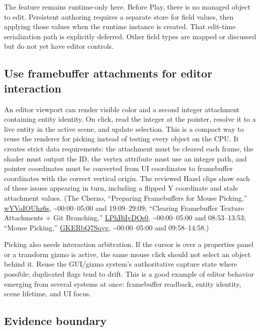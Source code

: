 The feature remains runtime-only here. Before Play, there is no managed object to edit. Persistent authoring requires a separate store for field values, then applying those values when the runtime instance is created. That edit-time serialization path is explicitly deferred. Other field types are mapped or discussed but do not yet have editor controls.

\subsection{Use framebuffer attachments for editor interaction}\label{06-engine-ii-ch032-use-framebuffer-attachments-for-editor-interaction}

\hypertarget{06-engine-ii-ch032-use-framebuffer-attachments-for-editor-interaction}{}

An editor viewport can render visible color and a second integer attachment containing entity identity. On click, read the integer at the pointer, resolve it to a live entity in the active scene, and update selection. This is a compact way to reuse the renderer for picking instead of testing every object on the CPU. It creates strict data requirements: the attachment must be cleared each frame, the shader must output the ID, the vertex attribute must use an integer path, and pointer coordinates must be converted from UI coordinates to framebuffer coordinates with the correct vertical origin. The reviewed Hazel clips show each of these issues appearing in turn, including a flipped Y coordinate and stale attachment values. (The Cherno, ``Preparing Framebuffers for Mouse Picking,'' \href{https://www.youtube.com/watch?v=wYVaIOUhz6s}{wYVaIOUhz6s}, \textasciitilde00:00--05:00 and 19:09--29:09; ``Clearing Framebuffer Texture Attachments + Git Branching,'' \href{https://www.youtube.com/watch?v=LPhBiIvDOs0}{LPhBiIvDOs0}, \textasciitilde00:00--05:00 and 08:53--13:53; ``Mouse Picking,'' \href{https://www.youtube.com/watch?v=GKERbQ7Sqyg}{GKERbQ7Sqyg}, \textasciitilde00:00--05:00 and 09:58--14:58.)

Picking also needs interaction arbitration. If the cursor is over a properties panel or a transform gizmo is active, the same mouse click should not select an object behind it. Reuse the GUI/gizmo system's authoritative capture state where possible; duplicated flags tend to drift. This is a good example of editor behavior emerging from several systems at once: framebuffer readback, entity identity, scene lifetime, and UI focus.

\subsection{Evidence boundary}\label{06-engine-ii-ch032-evidence-boundary}

